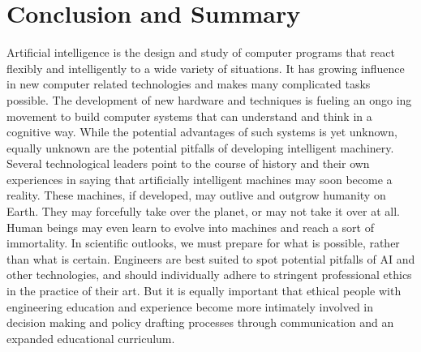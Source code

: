 \chapter{Conclusion and Summary}

\label{ch:summary}

Artificial intelligence is the design and study of computer programs that react
flexibly and intelligently to a wide variety of situations. It has growing influence in new
computer related technologies and makes many complicated tasks possible. The
development of new hardware and techniques is fueling an ongo ing movement to build
computer systems that can understand and think in a cognitive way. While the potential
advantages of such systems is yet unknown, equally unknown are the potential pitfalls of
developing intelligent machinery.\\

Several technological leaders point to the course of history and their own
experiences in saying that artificially intelligent machines may soon become a reality.
These machines, if developed, may outlive and outgrow humanity on Earth. They may
forcefully take over the planet, or may not take it over at all. Human beings may even
learn to evolve into machines and reach a sort of immortality. In scientific outlooks, we
must prepare for what is possible, rather than what is certain. Engineers are best suited to
spot potential pitfalls of AI and other technologies, and should individually adhere to
stringent professional ethics in the practice of their art. But it is equally important that
ethical people with engineering education and experience become more intimately
involved in decision making and policy drafting processes through communication and
an expanded educational curriculum.








